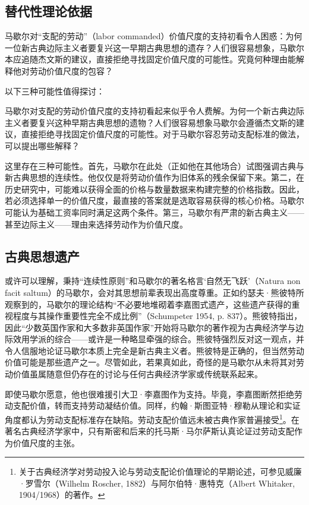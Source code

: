 \begin{translation}
\section{替代性理论依据}

马歇尔对“支配的劳动”（labor commanded）价值尺度的支持初看令人困惑：为何一位新古典边际主义者要复兴这一早期古典思想的遗存？人们很容易想象，马歇尔本应追随杰文斯的建议，直接拒绝寻找固定价值尺度的可能性。究竟何种理由能解释他对劳动价值尺度的包容？

以下三种可能性值得探讨：

马歇尔对支配的劳动价值尺度的支持初看起来似乎令人费解。为何一个新古典边际主义者要复兴这种早期古典思想的遗物？人们很容易想象马歇尔会遵循杰文斯的建议，直接拒绝寻找固定价值尺度的可能性。对于马歇尔容忍劳动支配标准的做法，可以提出哪些解释？

这里存在三种可能性。首先，马歇尔在此处（正如他在其他场合）试图强调古典与新古典思想的连续性。他仅仅是将劳动价值作为旧体系的残余保留下来。第二，在历史研究中，可能难以获得全面的价格与数量数据来构建完整的价格指数。因此，若必须选择单一的价值尺度，最直接的答案就是选取容易获得的核心价格。马歇尔可能认为基础工资率同时满足这两个条件。第三，马歇尔有严肃的新古典主义——甚至边际主义——理由来选择劳动作为价值尺度。

\subsection{古典思想遗产}

或许可以理解，秉持“连续性原则”和马歇尔的著名格言‘自然无飞跃’（Natura non facit saltum）的马歇尔，会对其思想前辈表现出高度尊重。正如约瑟夫·熊彼特所观察到的，马歇尔的理论结构“不必要地堆砌着李嘉图式遗产，这些遗产获得的重视程度与其操作重要性完全不成比例”（Schumpeter 1954, p. 837）。熊彼特指出，因此“少数英国作家和大多数非英国作家”开始将马歇尔的著作视为古典经济学与边际效用学派的综合——或许是一种略显牵强的综合。熊彼特强烈反对这一观点，并令人信服地论证马歇尔本质上完全是新古典主义者。熊彼特是正确的，但当然劳动价值可能是那些遗产之一。尽管如此，若果真如此，奇怪的是马歇尔从未将其对劳动价值虽属随意但仍存在的讨论与任何古典经济学家或传统联系起来。

即使马歇尔愿意，他也很难援引大卫·李嘉图作为支持。毕竟，李嘉图断然拒绝劳动支配价值，转而支持劳动凝结价值。同样，约翰·斯图亚特·穆勒从理论和实证角度都认为劳动支配标准存在缺陷。劳动支配价值远未被古典作家普遍接受\footnote{关于古典经济学对劳动投入论与劳动支配论价值理论的早期论述，可参见威廉·罗雪尔（Wilhelm Roscher, 1882）与阿尔伯特·惠特克（Albert Whitaker, 1904/1968）的著作。}。在著名古典经济学家中，只有斯密和后来的托马斯·马尔萨斯认真论证过劳动支配作为价值尺度的主张。


\end{translation}
